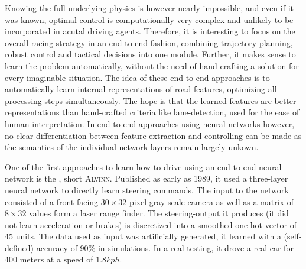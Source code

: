 Knowing the full underlying physics is however nearly impossible, and even if it was known, optimal control is computationally very complex and unlikely to be incorporated in acutal driving agents. Therefore, it is interesting to focus on the overall racing strategy in an end-to-end fashion, combining trajectory planning, robust control and tactical decisions into one module. Further, it makes sense to learn the problem automatically, without the need of hand-crafting a solution for every imaginable situation. The idea of these end-to-end approaches is to automatically learn internal representations of road features, optimizing all processing steps simultaneously. The hope is that the learned features are better representations than hand-crafted criteria like lane-detection, used for the ease of human interpretation. In end-to-end approaches using neural networks however, no clear differentiation between feature extraction and controlling can be made as the semantics of the individual network layers remain largely unkown.

One of the first approaches to learn how to drive using an end-to-end neural network is the , short \textsc{Alvinn}\cite{pomerleau_alvinn_1989}. Published as early as 1989, it used a three-layer neural network to directly learn steering commands. The input to the network consisted of a front-facing $30\times32$ pixel gray-scale camera as well as a matrix of $8\times32$ values form a laser range finder. The steering-output it produces (it did not learn acceleration or brakes) is discretized into a smoothed one-hot vector of 45 units. The data used as input was artificially generated, it learned with a (self-defined) accuracy of 90\% in simulations. In a real testing, it drove a real car for 400 meters at a speed of $1.8 kph$. 

